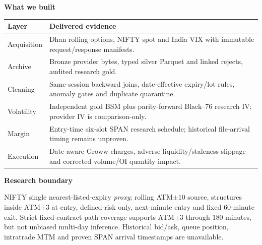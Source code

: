 \documentclass[10pt,a4paper]{article}
\begin{document}
\vspace{2mm}
\begin{minipage}[t]{0.485\linewidth}
{\large\bfseries\color{Navy} What we built}\par
\vspace{1mm}
\begin{tabularx}{\linewidth}{@{}p{20mm}Y@{}}
\toprule
Layer & Delivered evidence \\
\midrule
Acquisition & Dhan rolling options, NIFTY spot and India VIX with immutable request/response manifests. \\
Archive & Bronze provider bytes, typed silver Parquet and linked rejects, audited research gold. \\
Cleaning & Same-session backward joins, date-effective expiry/lot rules, anomaly gates and duplicate quarantine. \\
Volatility & Independent gold BSM plus parity-forward Black--76 research IV; provider IV is comparison-only. \\
Margin & Entry-time six-slot SPAN research schedule; historical file-arrival timing remains unproven. \\
Execution & Date-aware Groww charges, adverse liquidity/staleness slippage and corrected volume/OI quantity impact. \\
\bottomrule
\end{tabularx}

\vspace{2mm}
{\large\bfseries\color{Navy} Research boundary}\par
NIFTY single nearest-listed-expiry \emph{proxy}; rolling ATM$\pm10$ source, structures inside ATM$\pm3$ at entry, defined-risk only, next-minute entry and fixed 60-minute exit. Strict fixed-contract path coverage supports ATM$\pm3$ through 180 minutes, but not unbiased multi-day inference. Historical bid/ask, queue position, intratrade MTM and proven SPAN arrival timestamps are unavailable.
\end{minipage}
\hfill
\end{document}
